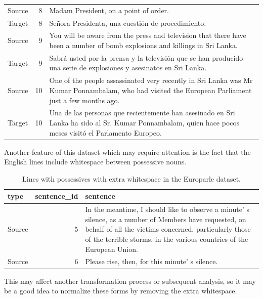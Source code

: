 \documentclass[
  letterpaper,
]{scrbook}
\begin{document}
\begin{table}
\begin{tabular}{lrl}
\addlinespace
Source & 8 & Madam President, on a point of order.\\
Target & 8 & Señora Presidenta, una cuestión de procedimiento.\\
Source & 9 & You will be aware from the press and television that there have been a number of bomb explosions and killings in Sri Lanka.\\
Target & 9 & Sabrá usted por la prensa y la televisión que se han producido una serie de explosiones y asesinatos en Sri Lanka.\\
Source & 10 & One of the people assassinated very recently in Sri Lanka was Mr Kumar Ponnambalam, who had visited the European Parliament just a few months ago.\\
\addlinespace
Target & 10 & Una de las personas que recientemente han asesinado en Sri Lanka ha sido al Sr. Kumar Ponnambalam, quien hace pocos meses visitó el Parlamento Europeo.\\
\bottomrule
\end{tabular}
\end{table}

Another feature of this dataset which may require attention is the fact
that the English lines include whitespace between possessive nouns.

\hypertarget{tbl-normalize-whitespace-identify-europarle}{}
\begin{table}
\caption{\label{tbl-normalize-whitespace-identify-europarle}Lines with possessives with extra whitespace in the Europarle dataset. }\tabularnewline

\centering
\begin{tabular}{lrl}
\toprule
type & sentence\_id & sentence\\
\midrule
Source & 5 & In the meantime, I should like to observe a minute' s silence, as a number of Members have requested, on behalf of all the victims concerned, particularly those of the terrible storms, in the various countries of the European Union.\\
Source & 6 & Please rise, then, for this minute' s silence.\\
\bottomrule
\end{tabular}
\end{table}

This may affect another transformation process or subsequent analysis,
so it may be a good idea to normalize these forms by removing the extra
whitespace.
\end{document}
